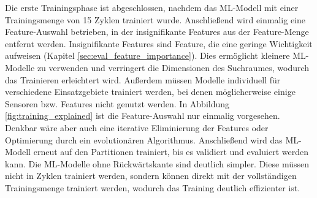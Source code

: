 \newline
\newline
Die erste Trainingsphase ist abgeschlossen, nachdem das ML-Modell mit einer Trainingsmenge von 15 Zyklen trainiert wurde.
Anschließend wird einmalig eine Feature-Auswahl betrieben, in der insignifikante Features aus der Feature-Menge entfernt werden.
Insignifikante Features sind Feature, die eine geringe Wichtigkeit aufweisen (Kapitel \ref{sec:eval_feature_importance}).
Dies ermöglicht kleinere ML-Modelle zu verwenden und verringert die Dimensionen des Suchraumes, wodurch das Trainieren erleichtert wird.
Außerdem müssen Modelle individuell für verschiedene Einsatzgebiete trainiert werden, bei denen möglicherweise einige Sensoren bzw. Features nicht genutzt werden.
In Abbildung \ref{fig:training_explained} ist die Feature-Auswahl nur einmalig vorgesehen.
Denkbar wäre aber auch eine iterative Eliminierung der Features oder Optimierung durch ein evolutionären Algorithmus.
Anschließend wird das ML-Modell erneut auf den Partitionen trainiert, bis es validiert und evaluiert werden kann.
\newline
\newline
Die ML-Modelle ohne Rückwärtskante sind deutlich simpler.
Diese müssen nicht in Zyklen trainiert werden, sondern können direkt mit der vollständigen Trainingsmenge trainiert werden,
wodurch das Training deutlich effizienter ist.